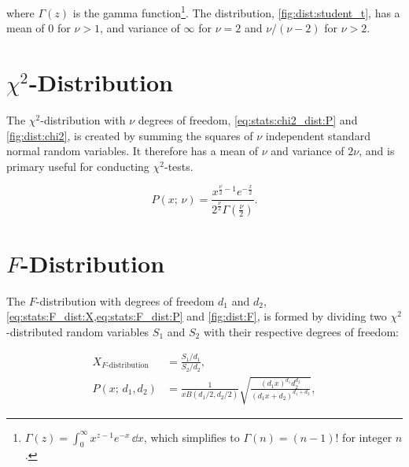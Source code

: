 \noindent where $\Gamma\left(z\right)$ is the gamma function\footnote{$\Gamma\left(z\right) = \int_{0}^{\infty} x^{z-1} e^{-x} \, \dd{x}$,
which simplifies to $\Gamma\left(n\right)=\left(n-1\right)!$ for integer $n$.}.
The distribution, \cref{fig:dist:student_t}, has a mean of \num{0} for $\nu > 1$,
and variance of $\infty$ for $\nu =2$ and $\nu / \left(\nu-2\right)$ for $\nu > 2$.

\section{\texorpdfstring{$\chi^{2}$-Distribution}{Chi-Squared Distribution}}
\label{stats:chi2_dist}

The $\chi^{2}$-distribution with $\nu$ degrees of freedom,
\cref{eq:stats:chi2_dist:P} and \cref{fig:dist:chi2},
is created by summing the squares of $\nu$ independent standard normal random variables.
It therefore has a mean of $\nu$ and variance of $2\nu$, and is
primary useful for conducting $\chi^{2}$-tests.

\begin{equation}\label{eq:stats:chi2_dist:P}
P\left(x;\,\nu\right) = \frac{
x^{\frac{\nu}{2} - 1} e^{-\frac{x}{2}}
}{
2^{\frac{\nu}{2}} \Gamma\left(\frac{\nu}{2}\right)}.
\end{equation}

\section{\texorpdfstring{$F$}{F}-Distribution}
\label{stats:F_dist}

The $F$-distribution with degrees of freedom $d_{1}$ and $d_{2}$,
\cref{eq:stats:F_dist:X,eq:stats:F_dist:P} and \cref{fig:dist:F},
is formed by dividing two $\chi^{2}$-distributed random variables
$S_{1}$ and $S_{2}$ with their respective degrees of freedom:

\begin{subequations}\label{eq:stats:F_dist}
\begin{align}
X_{F\text{-distribution}} &= \frac{S_{1}/d_{1}}{S_{2}/d_{2}}, \label{eq:stats:F_dist:X} \\
P\left(x;\,d_{1},d_{2}\right) &= \frac{1}{x B\left(d_{1}/2, d_{2}/2\right)} \sqrt{\frac{\left(d_{1} x\right)^{d_{1}} d_{2}^{d_{2}}}{\left(d_{1} x + d_{2}\right)^{d_{1}+d_{2}}}}, \label{eq:stats:F_dist:P}
\end{align}
\end{subequations}


